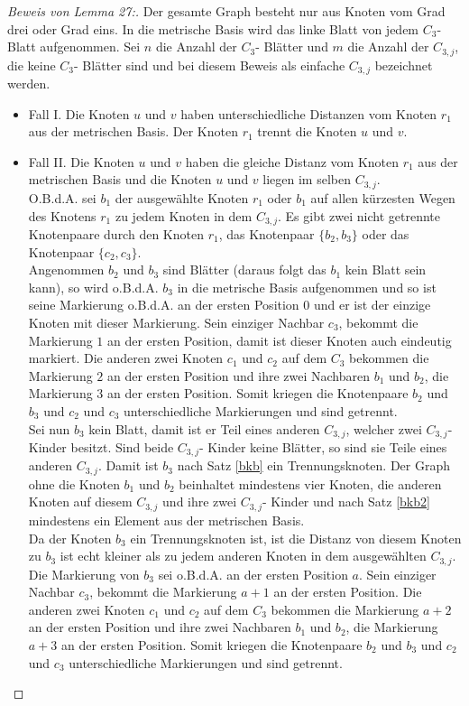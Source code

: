 \begin{proof}[Beweis von Lemma 27:]
Der gesamte Graph besteht nur aus Knoten vom Grad drei oder Grad eins. In die metrische Basis wird das linke Blatt von jedem $C_{3}$- Blatt aufgenommen. Sei $n$ die Anzahl der $C_{3}$- Blätter und $m$ die Anzahl der $C_{3,j}$, die keine $C_{3}$- Blätter sind und bei diesem Beweis als einfache $C_{3,j}$ bezeichnet werden.
\begin{itemize}
\item Fall I. Die Knoten $u$ und $v$ haben unterschiedliche Distanzen vom Knoten $r_1$ aus der metrischen Basis. Der Knoten $r_1$ trennt die Knoten $u$ und $v$.
\item Fall II. Die Knoten $u$ und $v$ haben die gleiche Distanz vom Knoten $r_1$ aus der metrischen Basis und die Knoten $u$ und $v$ liegen im selben $C_{3,j}$.\\
O.B.d.A. sei $b_1$ der ausgewählte Knoten $r_1$ oder $b_1$ auf allen kürzesten Wegen des Knotens $r_1$ zu jedem Knoten in dem $C_{3,j}$. Es gibt zwei nicht getrennte Knotenpaare durch den Knoten $r_1$, das Knotenpaar $\{b_2,b_3\}$ oder das Knotenpaar $\{c_2,c_3\}$.\\
Angenommen $b_2$ und $b_3$ sind Blätter (daraus folgt das $b_1$ kein Blatt sein kann), so wird o.B.d.A. $b_3$ in die metrische Basis aufgenommen und so ist seine Markierung o.B.d.A. an der ersten Position $0$ und er ist der einzige Knoten mit dieser Markierung. Sein einziger Nachbar $c_3$, bekommt die Markierung $1$ an der ersten Position, damit ist dieser Knoten auch eindeutig markiert. Die anderen zwei Knoten $c_1$ und $c_2$ auf dem $C_3$ bekommen die Markierung $2$ an der ersten Position und ihre zwei Nachbaren $b_1$ und $b_2$, die Markierung $3$ an der ersten Position. Somit kriegen die Knotenpaare $b_2$ und $b_3$ und $c_2$ und $c_3$ unterschiedliche Markierungen und sind getrennt.\\ 	 
Sei nun $b_3$ kein Blatt, damit ist er Teil eines anderen $C_{3,j}$, welcher zwei $C_{3,j}$-Kinder besitzt. Sind beide $C_{3,j}$- Kinder keine Blätter, so sind sie Teile eines anderen $C_{3,j}$. Damit ist $b_3$ nach Satz \ref{bkb} ein Trennungsknoten. Der Graph ohne die Knoten $b_1$ und $b_2$ beinhaltet mindestens vier Knoten, die anderen Knoten auf diesem $C_{3,j}$ und ihre zwei $C_{3,j}$- Kinder und nach Satz \ref{bkb2} mindestens ein Element aus der metrischen Basis.\\
Da der Knoten $b_3$ ein Trennungsknoten ist, ist die Distanz von diesem Knoten zu $b_3$ ist echt kleiner als zu jedem anderen Knoten in dem ausgewählten $C_{3,j}$. Die Markierung von $b_3$ sei o.B.d.A. an der ersten Position $a$. Sein einziger Nachbar $c_3$, bekommt die Markierung $a+1$ an der ersten Position. Die anderen zwei Knoten $c_1$ und $c_2$ auf dem $C_3$ bekommen die Markierung $a+2$ an der ersten Position und ihre zwei Nachbaren $b_1$ und $b_2$, die Markierung $a+3$ an der ersten Position. Somit kriegen die Knotenpaare $b_2$ und $b_3$ und $c_2$ und $c_3$ unterschiedliche Markierungen und sind getrennt.

\end{itemize}
\end{proof}
